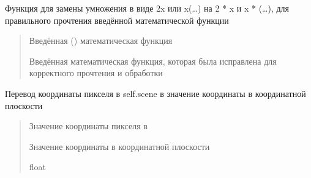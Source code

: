 \documentclass[letterpaper,10pt,russian]{sphinxmanual}
\begin{document}
\begin{fulllineitems}
\begin{fulllineitems}
\label{\detokenize{src:main.GraphicCalculator.fix_multiply}}
\pysigstartsignatures
\pysiglinewithargsret
{}
{}
{}
\pysigstopsignatures
\sphinxAtStartPar
Функция для замены умножения в виде 2x или x(…) на 2 * x и x * (…), для правильного прочтения введённой математической функции
\begin{quote}\begin{description}
\sphinxAtStartPar
{} \textendash{} Введённая () математическая функция

\sphinxAtStartPar
Введённая математическая функция, которая была исправлена для корректного прочтения и обработки

\end{description}\end{quote}

\end{fulllineitems}


\begin{fulllineitems}
\label{\detokenize{src:main.GraphicCalculator.pix_to_coord}}
\pysigstartsignatures
\pysiglinewithargsret
{}
{}
{}
\pysigstopsignatures
\sphinxAtStartPar
Перевод координаты пикселя в self.scene в значение координаты в координатной плоскости
\begin{quote}\begin{description}
\sphinxAtStartPar
{} \textendash{} Значение координаты пикселя в 

\sphinxAtStartPar
Значение координаты в координатной плоскости

\sphinxAtStartPar
float

\end{description}\end{quote}

\end{fulllineitems}



\end{fulllineitems}
\end{document}
